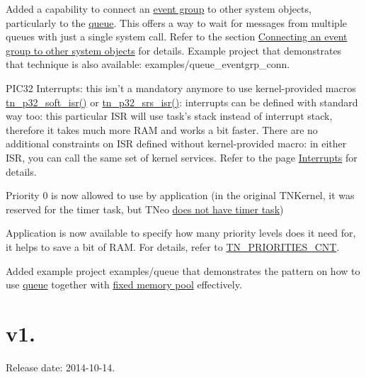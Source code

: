 \begin{DoxyItemize}
\item Added a capability to connect an \hyperlink{tn__eventgrp_8h}{event group} to other system objects, particularly to the \hyperlink{tn__dqueue_8h}{queue}. This offers a way to wait for messages from multiple queues with just a single system call. Refer to the section \hyperlink{tn__eventgrp_8h_eventgrp_connect}{Connecting an event group to other system objects} for details. Example project that demonstrates that technique is also available\+: {\ttfamily examples/queue\+\_\+eventgrp\+\_\+conn}.
\item P\+I\+C32 Interrupts\+: this isn't a mandatory anymore to use kernel-\/provided macros {\ttfamily \hyperlink{tn__arch__pic32_8h_a02d853d8d573f928fb8da65ef0c2bc8e}{tn\+\_\+p32\+\_\+soft\+\_\+isr()}} or {\ttfamily \hyperlink{tn__arch__pic32_8h_a523bb667617e6bb6f68a8f85855030a5}{tn\+\_\+p32\+\_\+srs\+\_\+isr()}}\+: interrupts can be defined with standard way too\+: this particular I\+S\+R will use task's stack instead of interrupt stack, therefore it takes much more R\+A\+M and works a bit faster. There are no additional constraints on I\+S\+R defined without kernel-\/provided macro\+: in either I\+S\+R, you can call the same set of kernel services. Refer to the page \hyperlink{interrupts}{Interrupts} for details.
\item Priority 0 is now allowed to use by application (in the original T\+N\+Kernel, it was reserved for the timer task, but T\+Neo \hyperlink{tnkernel_diff_tnkernel_diff_timer_task}{does not have timer task})
\item Application is now available to specify how many priority levels does it need for, it helps to save a bit of R\+A\+M. For details, refer to {\ttfamily \hyperlink{tn__cfg__default_8h_aad74a059c61567c68a1e9067ab47a256}{T\+N\+\_\+\+P\+R\+I\+O\+R\+I\+T\+I\+E\+S\+\_\+\+C\+N\+T}}.
\item Added example project {\ttfamily examples/queue} that demonstrates the pattern on how to use \hyperlink{tn__dqueue_8h}{queue} together with \hyperlink{tn__fmem_8h}{fixed memory pool} effectively.
\end{DoxyItemize}\hypertarget{changelog_changelog_v1_02}{}\section{v1.}\label{changelog_changelog_v1_02}
Release date\+: 2014-\/10-\/14.



